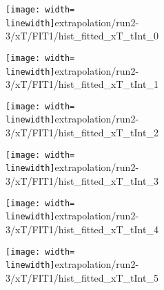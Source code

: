 \begin{figure}
\begin{subfigure}{0.45\linewidth}
\texttt{[image: width=\\linewidth]}{extrapolation/run2-3/xT/FIT1/hist_fitted_xT_tInt_0}
\end{subfigure}
\begin{subfigure}{0.45\linewidth}
\texttt{[image: width=\\linewidth]}{extrapolation/run2-3/xT/FIT1/hist_fitted_xT_tInt_1}
\end{subfigure}
\begin{subfigure}{0.45\linewidth}
\texttt{[image: width=\\linewidth]}{extrapolation/run2-3/xT/FIT1/hist_fitted_xT_tInt_2}
\end{subfigure}
\begin{subfigure}{0.45\linewidth}
\texttt{[image: width=\\linewidth]}{extrapolation/run2-3/xT/FIT1/hist_fitted_xT_tInt_3}
\end{subfigure}
\begin{subfigure}{0.45\linewidth}
\texttt{[image: width=\\linewidth]}{extrapolation/run2-3/xT/FIT1/hist_fitted_xT_tInt_4}
\end{subfigure}
\begin{subfigure}{0.45\linewidth}
\texttt{[image: width=\\linewidth]}{extrapolation/run2-3/xT/FIT1/hist_fitted_xT_tInt_5}
\end{subfigure}
\end{figure}
